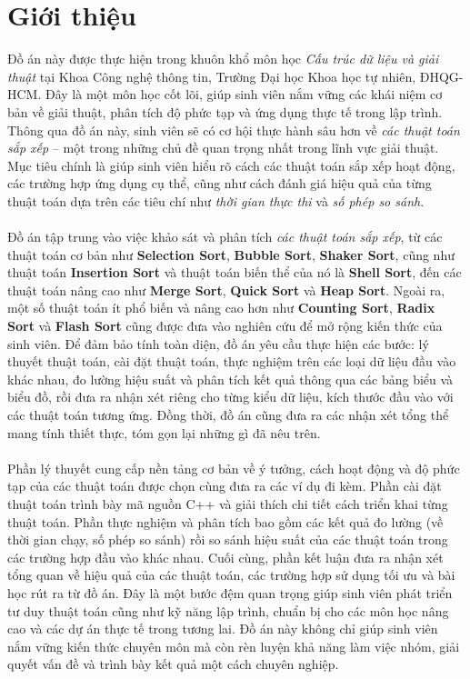 \section{Giới thiệu}

Đồ án này được thực hiện trong khuôn khổ môn học \textit{Cấu trúc dữ liệu 
và giải thuật} tại Khoa Công nghệ thông tin, Trường Đại học Khoa học tự nhiên, 
ĐHQG-HCM. Đây là một môn học cốt lõi, giúp sinh viên nắm vững các 
khái niệm cơ bản về giải thuật, phân tích độ phức tạp và ứng dụng 
thực tế trong lập trình. Thông qua đồ án này, sinh viên sẽ có cơ hội 
thực hành sâu hơn về \textit{các thuật toán sắp xếp} – một trong những chủ đề 
quan trọng nhất trong lĩnh vực giải thuật. Mục tiêu chính là giúp 
sinh viên hiểu rõ cách các thuật toán sắp xếp hoạt động, các trường hợp 
ứng dụng cụ thể, cũng như cách đánh giá hiệu quả của từng thuật toán 
dựa trên các tiêu chí như \textit{thời gian thực thi} và \textit{số phép so sánh}.
\\\\
Đồ án tập trung vào việc khảo sát và phân tích \textit{các thuật toán sắp 
xếp}, từ các thuật toán cơ bản như \textbf{Selection Sort}, \textbf{Bubble 
Sort}, \textbf{Shaker Sort}, cũng như thuật toán \textbf{Insertion Sort} 
và thuật toán biến thể của nó là \textbf{Shell Sort}, đến các thuật toán 
nâng cao như \textbf{Merge Sort}, \textbf{Quick Sort} và \textbf{Heap 
Sort}. Ngoài ra, một số thuật toán ít phổ biến và nâng cao hơn như 
\textbf{Counting Sort}, \textbf{Radix Sort} và \textbf{Flash Sort} cũng 
được đưa vào nghiên cứu để mở rộng kiến thức của sinh viên. Để đảm bảo 
tính toàn diện, đồ án yêu cầu thực hiện các bước: lý thuyết thuật toán, 
cài đặt thuật toán, thực nghiệm trên các loại dữ liệu đầu vào khác nhau, 
đo lường hiệu suất và phân tích kết quả thông qua các bảng biểu và biểu 
đồ, rồi đưa ra nhận xét riêng cho từng kiểu dữ liệu, kích thước đầu vào 
với các thuật toán tương ứng. Đồng thời, đồ án cũng đưa ra các nhận xét 
tổng thể mang tính thiết thực, tóm gọn lại những gì đã nêu trên.
\\\\
Phần lý thuyết cung cấp nền tảng cơ bản về ý tưởng, cách hoạt động và độ 
phức tạp của các thuật toán được chọn cùng đưa ra các ví dụ đi kèm. Phần 
cài đặt thuật toán trình bày mã nguồn C++ và giải thích chi tiết cách 
triển khai từng thuật toán. Phần thực nghiệm và phân tích bao gồm các 
kết quả đo lường (về thời gian chạy, số phép so sánh) rồi so sánh hiệu 
suất của các thuật toán trong các trường hợp đầu vào khác nhau. Cuối cùng, 
phần kết luận đưa ra nhận xét tổng quan về hiệu quả của các thuật toán, 
các trường hợp sử dụng tối ưu và bài học rút ra từ đồ án. Đây là một bước 
đệm quan trọng giúp sinh viên phát triển tư duy thuật toán cũng như kỹ 
năng lập trình, chuẩn bị cho các môn học nâng cao và các dự án thực tế 
trong tương lai. Đồ án này không chỉ giúp sinh viên nắm vững kiến thức 
chuyên môn mà còn rèn luyện khả năng làm việc nhóm, giải quyết vấn đề và 
trình bày kết quả một cách chuyên nghiệp. 